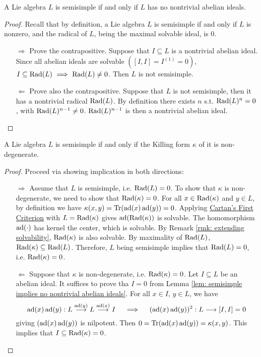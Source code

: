 \documentclass{article}
\begin{document}
\begin{lemma}\label{lem: semisimple implies no nontrivial abelian ideals}
    A Lie algebra $L$ is semisimple if and only if $L$ has no nontrivial abelian ideals.
\end{lemma}

\begin{proof}
    Recall that by definition, a Lie algebra $L$ is semisimple if and only if $L$ is nonzero, and the radical of $L$, being the maximal solvable ideal, is 0.
    \begin{itemize}
        \item[$\Rightarrow$] Prove the contrapositive. Suppose that $I \subseteq L$ is a nontrivial abelian ideal. Since all abelian ideals are solvable $([I, I] = I^{(1)} = 0)$, $I \subseteq \operatorname{Rad}(L) \ \Longrightarrow\  \operatorname{Rad}(L) \neq 0$. Then $L$ is not semisimple.
        \item[$\Leftarrow$] Prove also the contrapositive. Suppose that $L$ is not semisimple, then it has a nontrivial radical $\operatorname{Rad}(L)$. By definition there exists $n$ s.t. $\operatorname{Rad}(L)^n = 0$, with $\operatorname{Rad}(L)^{n-1} \neq 0$. $\operatorname{Rad}(L)^{n-1}$ is then a nontrivial abelian ideal.
    \end{itemize} 
\end{proof}

\begin{theorem}\label{thm: semisimple implies non-degenerate Killing form}
    A Lie algebra $L$ is semisimple if and only if the Killing form $\kappa$ of it is non-degenerate.
\end{theorem}

\begin{proof}
    Proceed via showing implication in both directions:
    \begin{itemize}
        \item[$\Rightarrow$] Assume that $L$ is semisimple, i.e. $\operatorname{Rad}(L) = 0$. To show that $\kappa$ is non-degenerate, we need to show that $\operatorname{Rad}(\kappa) = 0$. For all $x \in \operatorname{Rad}(\kappa)$ and $y \in L$, by definition we have $\kappa(x, y) = \operatorname{Tr}(\operatorname{ad}(x) \operatorname{ad}(y)) = 0$. Applying \hyperref[thm: Cartan's First Criterion]{Cartan's First Criterion} with $L = \operatorname{Rad}(\kappa)$ gives $\operatorname{ad}(\operatorname{Rad}(\kappa))$ is solvable. The homomorphism $\operatorname{ad}(\cdot)$ has kernel the center, which is solvable. By Remark \ref{rmk: extending solvability}, $\operatorname{Rad}(\kappa)$ is also solvable. By maximality of $\operatorname{Rad}(L)$, $\operatorname{Rad}(\kappa) \subseteq \operatorname{Rad}(L)$. Therefore, $L$ being semisimple implies that $\operatorname{Rad}(L) = 0$, i.e. $\operatorname{Rad}(\kappa) = 0$.
        \item[$\Leftarrow$] Suppose that $\kappa$ is non-degenerate, i.e. $\operatorname{Rad}(\kappa) = 0$. Let $I \subseteq L$ be an abelian ideal. It suffices to prove tha $I = 0$ from Lemma \ref{lem: semisimple implies no nontrivial abelian ideals}. For all $x \in I$, $y \in L$, we have
        \[
            \operatorname{ad}(x) \operatorname{ad}(y): L \overset{\operatorname{ad}(y)}{\longrightarrow} L \overset{\operatorname{ad}(x)}{\longrightarrow} I 
            \quad \ \Longrightarrow\  \quad
            (\operatorname{ad}(x) \operatorname{ad}(y))^2: L \longrightarrow [I, I] = 0
        \]
        giving $(\operatorname{ad}(x) \operatorname{ad}(y))$ is nilpotent. Then $0 = \operatorname{Tr}(\operatorname{ad}(x) \operatorname{ad}(y)) = \kappa(x, y)$. This implies that $I \subseteq \operatorname{Rad}(\kappa) = 0$.
    \end{itemize}
\end{proof} 
\end{document}
